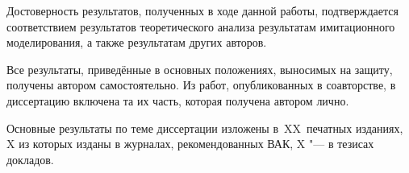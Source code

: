 {\reliability} Достоверность результатов, полученных в ходе данной работы, подтверждается соответствием результатов теоретического анализа  результатам имитационного моделирования, а также результатам других авторов.

{\probation}

{\contribution} Все результаты, приведённые в основных положениях, выносимых на защиту, получены автором самостоятельно. Из работ, опубликованных в соавторстве, в диссертацию включена та их часть, которая получена автором лично.

{%
    {\publications} Основные результаты по теме диссертации изложены
    в~XX~печатных изданиях,
    X из которых изданы в журналах, рекомендованных ВАК,
    X "--- в тезисах докладов.
}%

